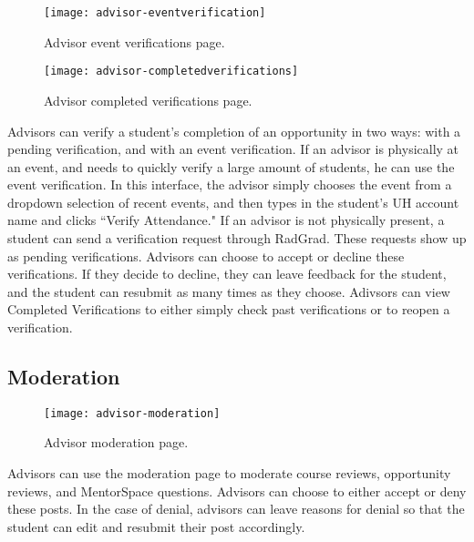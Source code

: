 \begin{figure}[htbp!]
\centering
\texttt{[image: advisor-eventverification]}
\caption{Advisor event verifications page.}
\end{figure}

\begin{figure}[htbp!]
\centering
\texttt{[image: advisor-completedverifications]}
\caption{Advisor completed verifications page.}
\end{figure}
Advisors can verify a student's completion of an opportunity in two ways: with a pending verification, and with an event verification. If an advisor is physically at an event, and needs to quickly verify a large amount of students, he can use the event verification. In this interface, the advisor simply chooses the event from a dropdown selection of recent events, and then types in the student's UH account name and clicks ``Verify Attendance." If an advisor is not physically present, a student can send a verification request through RadGrad. These requests show up as pending verifications. Advisors can choose to accept or decline these verifications. If they decide to decline, they can leave feedback for the student, and the student can resubmit as many times as they choose. Adivsors can view Completed Verifications to either simply check past verifications or to reopen a verification.
\subsection{Moderation}
\begin{figure}[htbp!]
\centering
\texttt{[image: advisor-moderation]}
\caption{Advisor moderation page.}
\end{figure}
Advisors can use the moderation page to moderate course reviews, opportunity reviews, and MentorSpace questions. Advisors can choose to either accept or deny these posts. In the case of denial, advisors can leave reasons for denial so that the student can edit and resubmit their post accordingly. 
